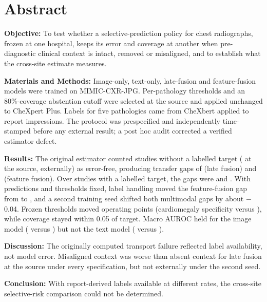 \documentclass[12pt,a4paper]{article}
\begin{document}
\section*{Abstract}
\noindent\textbf{Objective:} To test whether a selective-prediction policy for
chest radiographs, frozen at one hospital, keeps its error and coverage at
another when pre-diagnostic clinical context is intact, removed or misaligned,
and to establish what the cross-site estimate measures.

\noindent\textbf{Materials and Methods:} Image-only, text-only, late-fusion and
feature-fusion models were trained on MIMIC-CXR-JPG. Per-pathology thresholds
and an 80\%-coverage abstention cutoff were selected at the source and applied
unchanged to CheXpert Plus. Labels for five pathologies came from CheXbert
applied to report impressions. The protocol was prespecified and
independently time-stamped before any external result; a post hoc audit
corrected a verified estimator defect.

\noindent\textbf{Results:} The original estimator counted studies without a
labelled target (\NoLabSrcImpression{} at the source, \NoLabExtImpression{}
externally) as error-free, producing transfer gaps of \HOneMThreeOrigPt{} (late
fusion) and \HOneMFourOrigPt{} (feature fusion). Over studies with a labelled
target, the gaps were \HOneMThreeEvalPt{} and \HOneMFourEvalPt{}. With predictions and thresholds fixed, label handling moved
the feature-fusion gap from \SensUncPosHOneMFourPt{} to \SensUnmNegHOneMFourPt{},
and a second training seed shifted both multimodal gaps by about $-$0.04. Frozen
thresholds moved operating points (cardiomegaly specificity \MFourCardSpecSrc{}
versus \MFourCardSpecExt{}), while coverage stayed within 0.05 of target.
Macro AUROC held for the image model (\AucMOneSrc{} versus \AucMOneExt{}) but
not the text model (\AucMTwoSrc{} versus \AucMTwoExt{}).

\noindent\textbf{Discussion:} The originally computed transport failure
reflected label availability, not model error. Misaligned context was worse than absent context
for late fusion at the source under every specification, but not externally
under the second seed.

\noindent\textbf{Conclusion:} With report-derived labels available at
different rates, the cross-site selective-risk comparison could not be
determined.

\clearpage
\end{document}
